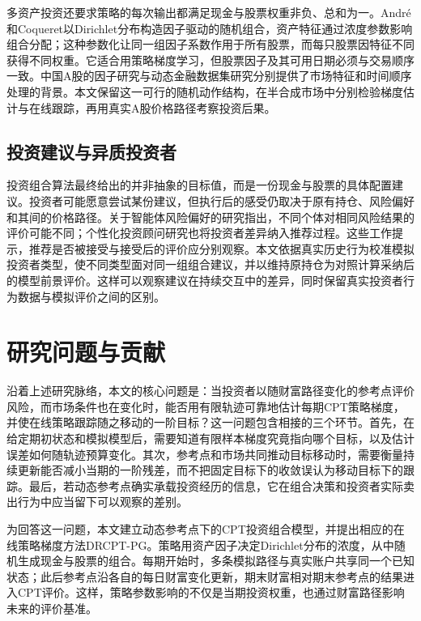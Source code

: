 多资产投资还要求策略的每次输出都满足现金与股票权重非负、总和为一。André 和Coqueret以Dirichlet分布构造因子驱动的随机组合，资产特征通过浓度参数影响组合分配；这种参数化让同一组因子系数作用于所有股票，而每只股票因特征不同获得不同权重\citep{andre2021dirichlet}。它适合用策略梯度学习，但股票因子及其可用日期必须与交易顺序一致。中国A股的因子研究与动态金融数据集研究分别提供了市场特征和时间顺序处理的背景\citep{hanauer2024factor,liu2024dynamicdatasets}。本文保留这一可行的随机动作结构，在半合成市场中分别检验梯度估计与在线跟踪，再用真实A股价格路径考察投资后果。

\subsection{投资建议与异质投资者}

投资组合算法最终给出的并非抽象的目标值，而是一份现金与股票的具体配置建议。投资者可能愿意尝试某份建议，但执行后的感受仍取决于原有持仓、风险偏好和其间的价格路径。关于智能体风险偏好的研究指出，不同个体对相同风险结果的评价可能不同\citep{liu2025riskpreferences}；个性化投资顾问研究也将投资者差异纳入推荐过程\citep{takayanagi2025financialadvisors}。这些工作提示，推荐是否被接受与接受后的评价应分别观察。本文依据真实历史行为校准模拟投资者类型，使不同类型面对同一组组合建议，并以维持原持仓为对照计算采纳后的模型前景评价。这样可以观察建议在持续交互中的差异，同时保留真实投资者行为数据与模拟评价之间的区别。

\section{研究问题与贡献}

沿着上述研究脉络，本文的核心问题是：当投资者以随财富路径变化的参考点评价风险，而市场条件也在变化时，能否用有限轨迹可靠地估计每期CPT策略梯度，并使在线策略跟踪随之移动的一阶目标？这一问题包含相接的三个环节。首先，在给定期初状态和模拟模型后，需要知道有限样本梯度究竟指向哪个目标，以及估计误差如何随轨迹预算变化。其次，参考点和市场共同推动目标移动时，需要衡量持续更新能否减小当期的一阶残差，而不把固定目标下的收敛误认为移动目标下的跟踪。最后，若动态参考点确实承载投资经历的信息，它在组合决策和投资者实际卖出行为中应当留下可以观察的差别。

为回答这一问题，本文建立动态参考点下的CPT投资组合模型，并提出相应的在线策略梯度方法DRCPT-PG。策略用资产因子决定Dirichlet分布的浓度，从中随机生成现金与股票的组合。每期开始时，多条模拟路径与真实账户共享同一个已知状态；此后参考点沿各自的每日财富变化更新，期末财富相对期末参考点的结果进入CPT评价。这样，策略参数影响的不仅是当期投资权重，也通过财富路径影响未来的评价基准。

